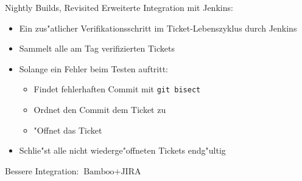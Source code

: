 \documentclass{beamer}
\begin{document}
\begin{frame}{Nightly Builds, Revisited}
	Erweiterte Integration mit Jenkins:
	\begin{itemize}
		\item Ein zus"atlicher Verifikationsschritt im Ticket-Lebenszyklus durch Jenkins
		\item Sammelt alle am Tag verifizierten Tickets
		\item Solange ein Fehler beim Testen auftritt:
			\begin{itemize}
				\item Findet fehlerhaften Commit mit \texttt{git bisect}
				\item Ordnet den Commit dem Ticket zu
				\item "Offnet das Ticket
			\end{itemize}
		\item Schlie"st alle nicht wiederge"offneten Tickets endg"ultig
	\end{itemize}
	Bessere Integration: $\text{Bamboo} + \text{JIRA}$
\end{frame}
\end{document}

